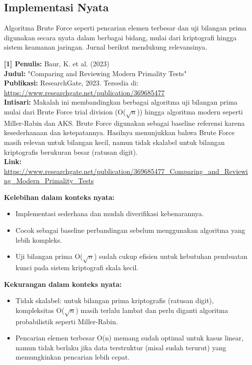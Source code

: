 \subsection{Implementasi Nyata}
Algoritma Brute Force seperti pencarian elemen terbesar dan uji bilangan prima digunakan secara nyata dalam berbagai bidang, mulai dari kriptografi hingga sistem keamanan jaringan. Jurnal berikut mendukung relevansinya.

\vspace{1em}
\textbf{[1] Penulis:} Baur, K. et al. (2023)\\
\textbf{Judul:} "Comparing and Reviewing Modern Primality Tests"\\
\textbf{Publikasi:} ResearchGate, 2023. Tersedia di: \url{https://www.researchgate.net/publication/369685477}\\
\textbf{Intisari:} Makalah ini membandingkan berbagai algoritma uji bilangan prima mulai dari Brute Force trial division (O($\sqrt{n}$)) hingga algoritma modern seperti Miller-Rabin dan AKS. Brute Force digunakan sebagai baseline referensi karena kesederhanaan dan ketepatannya. Hasilnya menunjukkan bahwa Brute Force masih relevan untuk bilangan kecil, namun tidak skalabel untuk bilangan kriptografis berukuran besar (ratusan digit).\\
\textbf{Link:} \url{https://www.researchgate.net/publication/369685477_Comparing_and_Reviewing_Modern_Primality_Tests}

\vspace{1em}
\textbf{Kelebihan dalam konteks nyata:}
\begin{itemize}
    \item Implementasi sederhana dan mudah diverifikasi kebenarannya.
    \item Cocok sebagai baseline perbandingan sebelum menggunakan algoritma yang lebih kompleks.
    \item Uji bilangan prima O($\sqrt{n}$) sudah cukup efisien untuk kebutuhan pembuatan kunci pada sistem kriptografi skala kecil.
\end{itemize}

\textbf{Kekurangan dalam konteks nyata:}
\begin{itemize}
    \item Tidak skalabel: untuk bilangan prima kriptografis (ratusan digit), kompleksitas O($\sqrt{n}$) masih terlalu lambat dan perlu diganti algoritma probabilistik seperti Miller-Rabin.
    \item Pencarian elemen terbesar O(n) memang sudah optimal untuk kasus linear, namun tidak berlaku jika data terstruktur (misal sudah terurut) yang memungkinkan pencarian lebih cepat.
\end{itemize}